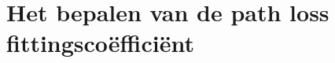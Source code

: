 \section{Het bepalen van de path loss fittingscoëfficiënt}
\label{ap:determineFittingsCoef}


    
    
    
    
    














